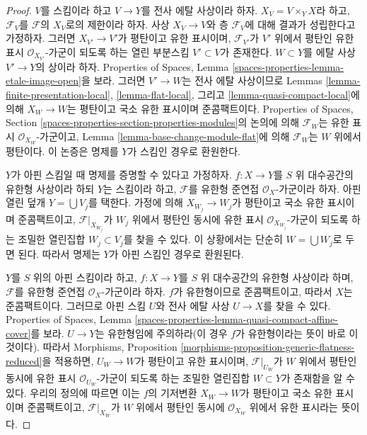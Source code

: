 \begin{proof}
$V$를 스킴이라 하고 $V \to Y$를 전사 에탈 사상이라 하자.
$X_V = V \times_Y X$라 하고, $\mathcal{F}_V$를
$\mathcal{F}$의 $X_V$로의 제한이라 하자. 사상 $X_V \to V$와
층 $\mathcal{F}_V$에 대해 결과가 성립한다고 가정하자.
그러면 $X_{V'} \to V'$가 평탄이고 유한 표시이며,
$\mathcal{F}_{V'}$가 $V'$ 위에서 평탄인 유한 표시
$\mathcal{O}_{X_{V'}}$-가군이 되도록 하는 열린 부분스킴
$V' \subset V$가 존재한다. $W \subset Y$를 에탈 사상
$V' \to Y$의 상이라 하자. Properties of Spaces, Lemma
\ref{spaces-properties-lemma-etale-image-open}을 보라.
그러면 $V' \to W$는 전사 에탈 사상이므로 Lemmas
\ref{lemma-finite-presentation-local},
\ref{lemma-flat-local}, 그리고
\ref{lemma-quasi-compact-local}에 의해 $X_W \to W$는 평탄이고
국소 유한 표시이며 준콤팩트이다.
Properties of Spaces, Section
\ref{spaces-properties-section-properties-modules}의 논의에 의해
$\mathcal{F}_W$는 유한 표시 $\mathcal{O}_{X_W}$-가군이고,
Lemma \ref{lemma-base-change-module-flat}에 의해
$\mathcal{F}_W$는 $W$ 위에서 평탄이다. 이 논증은 명제를
$Y$가 스킴인 경우로 환원한다.

\medskip\noindent
$Y$가 아핀 스킴일 때 명제를 증명할 수 있다고 가정하자.
$f : X \to Y$를 $S$ 위 대수공간의 유한형 사상이라 하되
$Y$는 스킴이라 하고, $\mathcal{F}$를 유한형 준연접
$\mathcal{O}_X$-가군이라 하자. 아핀 열린 덮개
$Y = \bigcup V_j$를 택한다. 가정에 의해 $X_{W_j} \to W_j$가
평탄이고 국소 유한 표시이며 준콤팩트이고,
$\mathcal{F}|_{X_{W_j}}$가 $W_j$ 위에서 평탄인 동시에
유한 표시 $\mathcal{O}_{X_{W_j}}$-가군이 되도록 하는 조밀한 열린집합
$W_j \subset V_j$를 찾을 수 있다. 이 상황에서는 단순히
$W = \bigcup W_j$로 두면 된다. 따라서 명제는 $Y$가 아핀 스킴인
경우로 환원된다.

\medskip\noindent
$Y$를 $S$ 위의 아핀 스킴이라 하고,
$f : X \to Y$를 $S$ 위 대수공간의 유한형 사상이라 하며,
$\mathcal{F}$를 유한형 준연접 $\mathcal{O}_X$-가군이라 하자.
$f$가 유한형이므로 준콤팩트이고, 따라서 $X$는 준콤팩트이다.
그러므로 아핀 스킴 $U$와 전사 에탈 사상 $U \to X$를 찾을 수 있다.
Properties of Spaces, Lemma
\ref{spaces-properties-lemma-quasi-compact-affine-cover}를 보라.
$U \to Y$는 유한형임에 주의하라(이 경우 $f$가 유한형이라는
뜻이 바로 이것이다). 따라서 Morphisms, Proposition
\ref{morphisms-proposition-generic-flatness-reduced}을 적용하면,
$U_W \to W$가 평탄이고 유한 표시이며,
$\mathcal{F}|_{U_W}$가 $W$ 위에서 평탄인 동시에 유한 표시
$\mathcal{O}_{U_W}$-가군이 되도록 하는 조밀한 열린집합
$W \subset Y$가 존재함을 알 수 있다. 우리의 정의에 따르면 이는
$f$의 기저변환 $X_W \to W$가 평탄이고 국소 유한 표시이며
준콤팩트이고, $\mathcal{F}|_{X_W}$가 $W$ 위에서 평탄인 동시에
$\mathcal{O}_{X_W}$ 위에서 유한 표시라는 뜻이다.
\end{proof}

